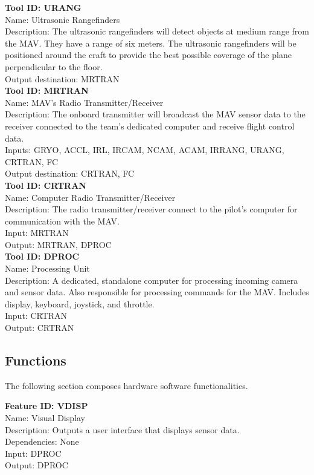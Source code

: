 \documentclass[onecolumn, oneside, letterpaper, draftclsnofoot, 10pt, compsoc]{IEEEtran}
\begin{document}
\noindent
\textbf{Tool ID: URANG}\\
Name: Ultrasonic Rangefinders\\
Description: The ultrasonic rangefinders will detect objects at medium range from the MAV. They have a range of six meters. The ultrasonic rangefinders will be positioned around the craft to provide the best possible coverage of the plane perpendicular to the floor.\\
Output destination: MRTRAN\\

\noindent
\textbf{Tool ID: MRTRAN}\\
Name: MAV’s Radio Transmitter/Receiver\\
Description: The onboard transmitter will broadcast the MAV sensor data to the receiver connected to the team’s dedicated computer and receive flight control data.\\
Inputs: GRYO, ACCL, IRL, IRCAM, NCAM, ACAM, IRRANG, URANG, CRTRAN, FC\\
Output destination: CRTRAN, FC\\

\noindent
\textbf{Tool ID: CRTRAN}\\
Name: Computer Radio Transmitter/Receiver\\
Description: The radio transmitter/receiver connect to the pilot’s computer for communication with the MAV.\\
Input: MRTRAN\\
Output: MRTRAN, DPROC\\

\noindent
\textbf{Tool ID: DPROC}\\
Name: Processing Unit\\
Description: A dedicated, standalone computer for processing incoming camera and sensor data. Also responsible for processing commands for the MAV. Includes display, keyboard, joystick, and throttle.\\
Input: CRTRAN\\
Output: CRTRAN

\subsection{Functions}
The following section composes hardware software functionalities.

\noindent
\textbf{Feature ID: VDISP}\\
Name: Visual Display\\
Description: Outputs a user interface that displays sensor data.\\
Dependencies: None\\
Input: DPROC\\
Output: DPROC\\
\end{document}
